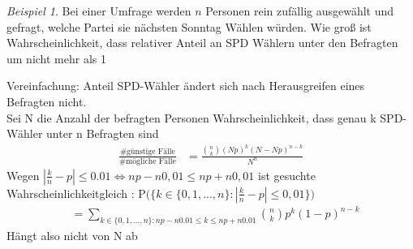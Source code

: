 \documentclass[a4paper,12pt,fleqn]{scrartcl}
\newcommand{\p}[1]{\text{P(} #1 \text{)}}
\newcommand{\Wk}{Wahrscheinlichkeit}
\theoremstyle{definition}
\theoremstyle{plain}
\theoremstyle{remark}
\newtheorem{beispiel}[definition]{Beispiel}
\begin{document}
\begin{beispiel}
Bei einer Umfrage werden $n$ Personen rein zufällig ausgewählt und gefragt, welche Partei sie nächsten Sonntag Wählen würden. Wie groß ist \Wk , dass relativer Anteil an SPD Wählern unter den Befragten um nicht mehr als 1%

Vereinfachung: Anteil SPD-Wähler ändert sich nach Herausgreifen eines Befragten nicht. \\

Sei N die Anzahl der befragten Personen \Wk , dass genau k SPD-Wähler unter n Befragten sind 
\begin{align*}
\frac{\text{\# günstige Fälle}}{\text{\# mögliche Fälle}}
&= \frac{\binom{n}{k} (Np)^k (N-Np)^{n-k}}{N^n}
\end{align*}
Wegen $|\frac{k}{n} - p | \leq 0.01 \iff np-n0,01 \leq np + n0,01$ ist gesuchte \Wk gleich : $ \p{ \{ k \in \{ 0,1,...,n \} : |\frac{k}{n} -p| \leq 0,01 \}}$
\begin{align*}
&= \sum_{k \in \{ 0,1,...,n \}: np-n0.01 \leq k \leq np+n0.01}{  \binom{n}{k} p^k (1-p)^{n-k}}
\end{align*}
Hängt also nicht von N ab 
\end{beispiel}
\end{document}
